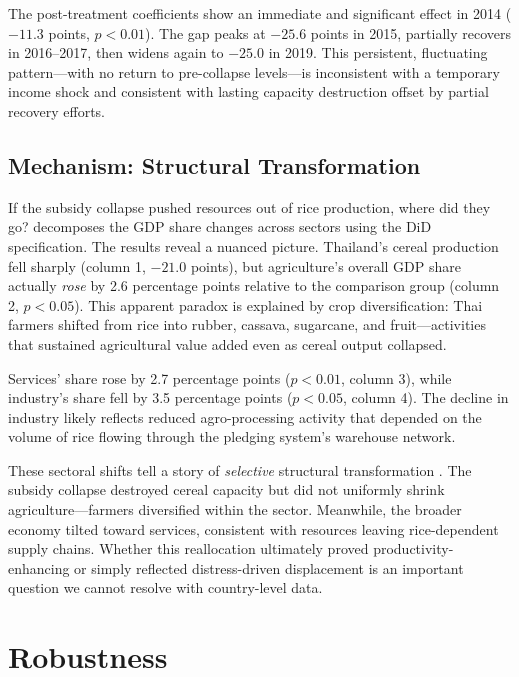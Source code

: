 \documentclass[12pt]{article}
\begin{document}
The post-treatment coefficients show an immediate and significant effect in 2014 ($-11.3$ points, $p < 0.01$). The gap peaks at $-25.6$ points in 2015, partially recovers in 2016--2017, then widens again to $-25.0$ in 2019. This persistent, fluctuating pattern---with no return to pre-collapse levels---is inconsistent with a temporary income shock and consistent with lasting capacity destruction offset by partial recovery efforts.

\subsection{Mechanism: Structural Transformation}

If the subsidy collapse pushed resources out of rice production, where did they go?  decomposes the GDP share changes across sectors using the DiD specification. The results reveal a nuanced picture. Thailand's cereal production fell sharply (column 1, $-21.0$ points), but agriculture's overall GDP share actually \textit{rose} by 2.6 percentage points relative to the comparison group (column 2, $p < 0.05$). This apparent paradox is explained by crop diversification: Thai farmers shifted from rice into rubber, cassava, sugarcane, and fruit---activities that sustained agricultural value added even as cereal output collapsed.



Services' share rose by 2.7 percentage points ($p < 0.01$, column 3), while industry's share fell by 3.5 percentage points ($p < 0.05$, column 4). The decline in industry likely reflects reduced agro-processing activity that depended on the volume of rice flowing through the pledging system's warehouse network.

These sectoral shifts tell a story of \textit{selective} structural transformation \citep{herrendorf2014, mcmillan2014}. The subsidy collapse destroyed cereal capacity but did not uniformly shrink agriculture---farmers diversified within the sector. Meanwhile, the broader economy tilted toward services, consistent with resources leaving rice-dependent supply chains. Whether this reallocation ultimately proved productivity-enhancing or simply reflected distress-driven displacement is an important question we cannot resolve with country-level data.

\section{Robustness}\label{sec:robustness}
\end{document}
